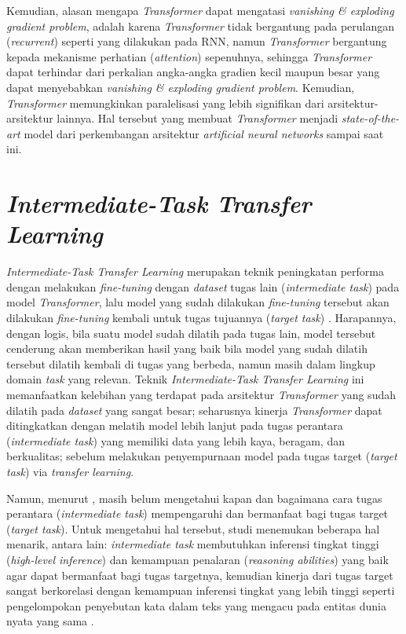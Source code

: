 Kemudian, alasan mengapa \emph{Transformer} dapat mengatasi \emph{vanishing \& exploding gradient problem}, adalah karena \emph{Transformer} tidak bergantung pada perulangan (\emph{recurrent}) seperti yang dilakukan pada RNN, namun \emph{Transformer} bergantung kepada mekanisme perhatian (\emph{attention}) sepenuhnya, sehingga \emph{Transformer} dapat terhindar dari perkalian angka-angka gradien kecil maupun besar yang dapat menyebabkan \emph{vanishing \& exploding gradient problem}. Kemudian, \emph{Transformer} memungkinkan paralelisasi yang lebih signifikan dari arsitektur-arsitektur lainnya. Hal tersebut yang membuat \emph{Transformer} menjadi \emph{state-of-the-art} model dari perkembangan arsitektur \emph{artificial neural networks} sampai saat ini.

\section{\emph{Intermediate-Task Transfer Learning}}
\emph{Intermediate-Task Transfer Learning} merupakan teknik peningkatan performa dengan melakukan \emph{fine-tuning} dengan \emph{dataset} tugas lain (\emph{intermediate task}) pada model \emph{Transformer}, lalu model yang sudah dilakukan \emph{fine-tuning} tersebut akan dilakukan \emph{fine-tuning} kembali untuk tugas tujuannya (\emph{target task}) \citep{pruksachatkun-etal-2020-intermediate}. Harapannya, dengan logis, bila suatu model sudah dilatih pada tugas lain, model tersebut cenderung akan memberikan hasil yang baik bila model yang sudah dilatih tersebut dilatih kembali di tugas yang berbeda, namun masih dalam lingkup domain \emph{task} yang relevan. Teknik \emph{Intermediate-Task Transfer Learning} ini memanfaatkan kelebihan yang terdapat pada arsitektur \emph{Transformer} yang sudah dilatih pada \emph{dataset} yang sangat besar; seharusnya kinerja \emph{Transformer} dapat ditingkatkan dengan melatih model lebih lanjut pada tugas perantara (\emph{intermediate task}) yang memiliki data yang lebih kaya, beragam, dan berkualitas; sebelum melakukan penyempurnaan model pada tugas target (\emph{target task}) via \emph{transfer learning}. 

Namun, menurut \citet{pruksachatkun-etal-2020-intermediate}, masih belum mengetahui kapan dan bagaimana cara tugas perantara (\emph{intermediate task}) mempengaruhi dan bermanfaat bagi tugas target (\emph{target task}). Untuk mengetahui hal tersebut, studi \citet{pruksachatkun-etal-2020-intermediate} menemukan beberapa hal menarik, antara lain: \emph{intermediate task} membutuhkan inferensi tingkat tinggi (\emph{high-level inference}) dan kemampuan penalaran (\emph{reasoning abilities}) yang baik agar dapat bermanfaat bagi tugas targetnya, kemudian kinerja dari tugas target sangat berkorelasi dengan kemampuan inferensi tingkat yang lebih tinggi seperti pengelompokan penyebutan kata dalam teks yang mengacu pada entitas dunia nyata yang sama \citep{coference-resolution}.

